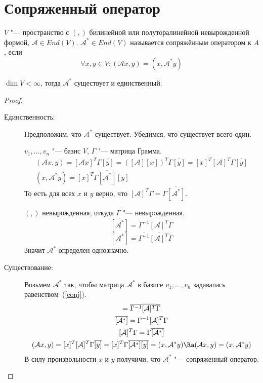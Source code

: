 \section{Сопряженный оператор}

\begin{Def}
	$V$ "--- пространство с $(,)$ билинейной или полуторалинейной невырожденной формой, $\mathcal A \in End(V)$.
	$\mathcal A^* \in End(V)$ называется сопряжённым оператором к $A$, если
$$\forall x, y \in V \colon (\mathcal Ax, y) = (x, \mathcal A^*y)$$
\end{Def}

\begin{theorem}
	$\dim V < \infty$, тогда $\mathcal A^*$ существует и единственный.
\end{theorem}
\begin{proof}
	\begin{description}
	\item[Единственность:]
		Предположим, что $\mathcal A^*$ существует.
		Убедимся, что существует всего один.

		$v_1, \dots, v_n$ "--- базис $V$,
		$\Gamma$ "--- матрица Грамма.
		\begin{gather*}
			(\mathcal Ax, y) = [\mathcal Ax]^T \Gamma \overline{[y]}
			= ([\mathcal A][x])^T \Gamma \overline{[y]}
			= [x]^T [\mathcal A]^T \Gamma \overline{[y]} \\
			(x, \mathcal A^* y) = [x]^T \Gamma \overline{[\mathcal A^*]} \overline{[y]}
		\end{gather*}
		То есть для всех $x$ и $y$ верно, что $[\mathcal A]^T \Gamma = \Gamma \overline{[\mathcal A^*]}$.

		$(,)$ невырожденная, откуда $\Gamma$ "--- невырожденная.
		\[ \overline{[\mathcal A^*]} = \Gamma^{-1} [\mathcal A]^T \Gamma \]
		\begin{equation}\label{conj}
			[\mathcal A^*] = \overline{\Gamma^{-1}} \overline{[\mathcal A]^T}\overline{\Gamma}
		\end{equation}
		Значит $\mathcal A^*$ определен однозначно.

	\item[Существование:]
		Возьмем $\mathcal A^*$ так, чтобы матрица $\mathcal A^*$ в базисе $v_1, \dots, v_n$ задавалась равенством~(\ref{conj}).
		\begin{gather*}
			[\mathcal A^*] = \overline{\Gamma^{-1}} \overline{[\mathcal A]^T} \overline{\Gamma} \\
			\overline{[\mathcal A^*]} = \Gamma^{-1} [\mathcal A]^T \Gamma \\
			[\mathcal A]^T \Gamma = \Gamma \overline{[\mathcal A^*]} \\
			(\mathcal Ax, y) = [x]^T [\mathcal A]^T \Gamma \overline{[y]}
			= [x]^T \Gamma \overline{[\mathcal A^*]} \overline{[y]} = (x, \mathcal A^*y)
			\Ra (\mathcal Ax, y) = (x,  \mathcal A^*y)
		\end{gather*}
		В силу произвольности $x$ и $y$ получичи, что $\mathcal A^*$ "--- сопряженный оператор.
	\end{description}
\end{proof}

